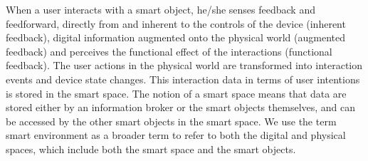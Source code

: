 When a user interacts with a smart object, he/she senses feedback and feedforward, directly from and inherent to the controls of the device (inherent feedback), digital information augmented onto the physical world (augmented feedback) and perceives the functional effect of the interactions (functional feedback). The user actions in the physical world are transformed into interaction events and device state changes. This interaction data in terms of user intentions is stored in the smart space. The notion of a smart space means that data are stored either by an information broker or the smart objects themselves, and can be accessed by the other smart objects in the smart space. We use the term smart environment as a broader term to refer to both the digital and physical spaces, which include both the smart space and the smart objects.







